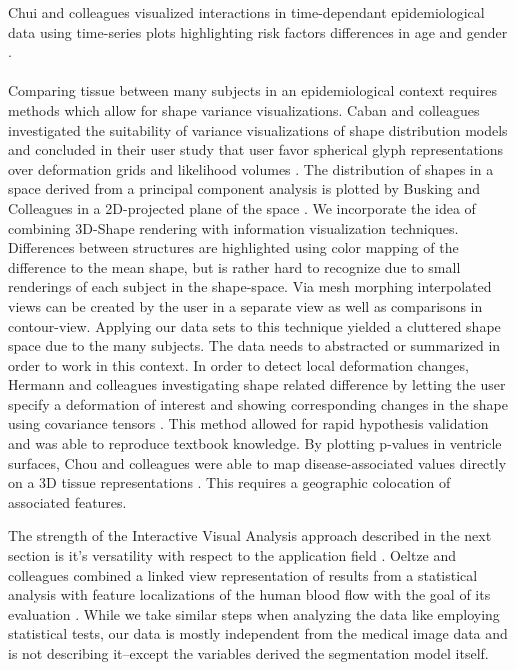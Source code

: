 \documentclass[journal]{style/vgtc}           %
\begin{document}
Chui and colleagues visualized interactions in time-dependant epidemiological data using time-series plots highlighting risk factors differences in age and gender \cite{Chui2011}.
%
\\\\
Comparing tissue between many subjects in an epidemiological context requires methods which allow for shape variance visualizations.
%
Caban and colleagues investigated the suitability of variance visualizations of shape distribution models and concluded in their user study that user favor spherical glyph representations over deformation grids and likelihood volumes \cite{Caban2011}.
%
The distribution of shapes in a space derived from a principal component analysis is plotted by Busking and Colleagues in a 2D-projected plane of the space \cite{Busking2010a}.
%
We incorporate the idea of combining 3D-Shape rendering with information visualization techniques.
%
Differences between structures are highlighted using color mapping of the difference to the mean shape, but is rather hard to recognize due to small renderings of each subject in the shape-space.
%
Via mesh morphing interpolated views can be created by the user in a separate view as well as comparisons in contour-view.
%
Applying our data sets to this technique yielded a cluttered shape space due to the many subjects.
%
The data needs to abstracted or summarized in order to work in this context.
%
In order to detect local deformation changes, Hermann and colleagues investigating shape related difference by letting the user specify a deformation of interest and showing corresponding changes in the shape using covariance tensors \cite{Hermann2014}.
%
This method allowed for rapid hypothesis validation and was able to reproduce textbook knowledge.
%
By plotting p-values in ventricle surfaces, Chou and colleagues were able to map disease-associated values directly on a 3D tissue representations \cite{Chou2009}.
%
This requires a geographic colocation of associated features.
%

The strength of the Interactive Visual Analysis approach described in the next section is it's versatility with respect to the application field \cite{Konyha2009}.
%
Oeltze and colleagues combined a linked view representation of results from a statistical analysis with feature localizations of the human blood flow with the goal of its evaluation \cite{Oeltze2007}.
%
While we take similar steps when analyzing the data like employing statistical tests, our data is mostly independent from the medical image data and is not describing it--except the variables derived the segmentation model itself.
\end{document}
